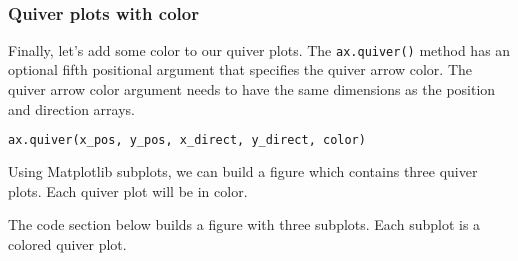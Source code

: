 \documentclass{book}
\newcommand{\passthrough}[1]{#1}
\begin{document}
    \begin{center}
    \end{center}
    { \hspace*{\fill} \\}
    

    
        \hypertarget{quiver-plots-with-color}{%
\subsubsection{Quiver plots with color}\label{quiver-plots-with-color}}

Finally, let's add some color to our quiver plots. The
\passthrough{\lstinline!ax.quiver()!} method has an optional fifth
positional argument that specifies the quiver arrow color. The quiver
arrow color argument needs to have the same dimensions as the position
and direction arrays.

\begin{lstlisting}[language=Python]
ax.quiver(x_pos, y_pos, x_direct, y_direct, color)
\end{lstlisting}

Using Matplotlib subplots, we can build a figure which contains three
quiver plots. Each quiver plot will be in color.

The code section below builds a figure with three subplots. Each subplot
is a colored quiver plot.
    
\end{document}
